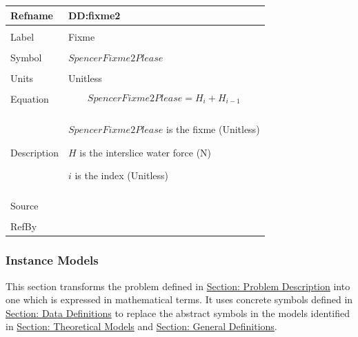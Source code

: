 \documentclass[12pt]{article}
\begin{document}
\noindent \begin{minipage}{\textwidth}
\begin{tabular}{p{} p{}}
\toprule \textbf{Refname} & \textbf{DD:fixme2}
\label{DD:fixme2}
\\ \midrule \\
Label & Fixme
        \\ \midrule \\
        Symbol & $SpencerFixme2Please$
                 \\ \midrule \\
                 Units & Unitless
                         \\ \midrule \\
                         Equation & \begin{displaymath}
                                    SpencerFixme2Please=H_{i}+H_{i-1}
                                    \end{displaymath}
                                    \\ \midrule \\
                                    Description & \begin{symbDescription}
                                                  \item{$SpencerFixme2Please$ is the fixme (Unitless)}
                                                  \item{$H$ is the interslice water force (N)}
                                                  \item{$i$ is the index (Unitless)}
                                                  \end{symbDescription}
                                                  \\ \midrule \\
                                                  Source & \\ \midrule \\
                                                           RefBy & 
\\ \bottomrule \end{tabular}
\end{minipage}
\subsubsection{Instance Models}
\label{Sec:IMs}
This section transforms the problem defined in \hyperref[Sec:ProbDesc]{Section: Problem Description} into one which is expressed in mathematical terms. It uses concrete symbols defined in \hyperref[Sec:DDs]{Section: Data Definitions} to replace the abstract symbols in the models identified in \hyperref[Sec:TMs]{Section: Theoretical Models} and \hyperref[Sec:GDs]{Section: General Definitions}.
\par~
\end{document}
